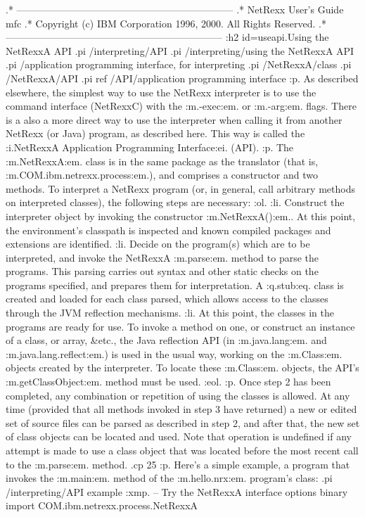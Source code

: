 .* ------------------------------------------------------------------
.* NetRexx User's Guide                                              mfc
.* Copyright (c) IBM Corporation 1996, 2000.  All Rights Reserved.
.* ------------------------------------------------------------------
:h2 id=useapi.Using the NetRexxA API
.pi /interpreting/API
.pi /interpreting/using the NetRexxA API
.pi /application programming interface, for interpreting
.pi /NetRexxA/class
.pi /NetRexxA/API
.pi ref /API/application programming interface
:p.
As described elsewhere, the simplest way to use the NetRexx interpreter
is to use the command interface (NetRexxC) with the :m.-exec:em.
or :m.-arg:em. flags.
There is a also a more direct way to use the interpreter when calling it
from another NetRexx (or Java) program, as described here.  This
way is called the :i.NetRexxA Application Programming Interface:ei.
(API).
:p.
The :m.NetRexxA:em. class is in the same package as the translator
(that is, :m.COM.ibm.netrexx.process:em.), and comprises a constructor
and two methods.  To interpret a NetRexx program (or, in general, call
arbitrary methods on interpreted classes), the following steps are
necessary:
:ol.
:li.
Construct the interpreter object by invoking the constructor :m.NetRexxA():em..
At this point, the environment's classpath is inspected and known
compiled packages and extensions are identified.
:li.
Decide on the program(s) which are to be interpreted, and invoke the
NetRexxA :m.parse:em. method to parse the programs.  This parsing
carries out syntax and other static checks on the programs specified,
and prepares them for interpretation.  A :q.stub:eq. class is created
and loaded for each class parsed, which allows access to the classes
through the JVM reflection mechanisms.
:li.
At this point, the classes in the programs are ready for use.  To invoke
a method on one, or construct an instance of a class, or array, &etc.,
the Java reflection API (in :m.java.lang:em. and :m.java.lang.reflect:em.)
is used in the usual way, working on the :m.Class:em. objects created by
the interpreter.  To locate these :m.Class:em. objects, the
API's :m.getClassObject:em. method must be used.
:eol.
:p.
Once step 2 has been completed, any combination or repetition of using
the classes is allowed.  At any time (provided that all methods invoked
in step 3 have returned) a new or edited set of source files can be
parsed as described in step 2, and after that, the new set of class
objects can be located and used.  Note that operation is undefined if
any attempt is made to use a class object that was located before the
most recent call to the :m.parse:em. method.
.cp 25
:p.
Here's a simple example, a program that invokes the :m.main:em. method
of the :m.hello.nrx:em. program's class:
.pi /interpreting/API example
:xmp.
-- Try the NetRexxA interface
options binary
import COM.ibm.netrexx.process.NetRexxA

